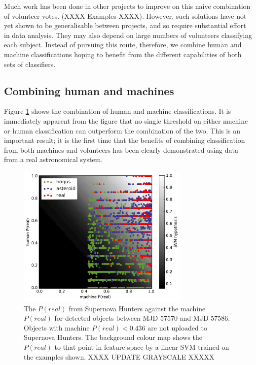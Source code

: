 \documentclass[a4paper,fleqn,usenatbib]{mnras}
\begin{document}
Much work has been done in other projects to improve on this naive combination of volunteer votes. (XXXX Examples XXXX). However, such solutions have not yet shown to be generalisable between projects, and so require substantial effort in data analysis. They may also depend on large numbers of volunteers classifying each subject. Instead of pursuing this route, therefore, we combine human and machine classifications hoping to benefit from the different capabilities of both sets of classifiers. 

\subsection{Combining human and machines} 

Figure \ref{fig:combo_train} shows the combination of human and machine classifications. It is immediately apparent from the figure that no single threshold on either machine or human classification can outperform the combination of the two. This is an important result; it is the first time that the benefits of combining classification from both machines and volunteers has been clearly demonstrated using data from a real astronomical system. 

\begin{figure}
   \includegraphics[width=84mm]{figs/human_v_machine_train.pdf}
   \caption{The $P(real)$ from Supernova Hunters against the machine $P(real)$ for detected 
            objects between MJD 57570 and MJD 57586.  Objects with machine $P(real) < 0.436$ are
            not uploaded to Supernova Hunters.  The background colour map shows 
            the $P(real)$ to that point in feature space by a linear SVM trained on the 
            examples shown. XXXX UPDATE GRAYSCALE XXXXX}
   \label{fig:combo_train} 
\end{figure}
\end{document}
